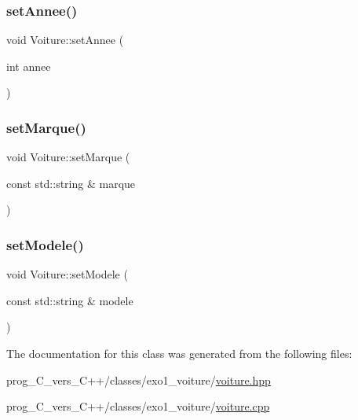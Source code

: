 \mbox{\label{classVoiture_aa8fcdac2ea378e472732cbea73f35952}} 
\subsubsection{\texorpdfstring{set\+Annee()}{setAnnee()}}
{\footnotesize\ttfamily void Voiture\+::set\+Annee (\begin{DoxyParamCaption}\item[{int}]{annee }\end{DoxyParamCaption})}

\mbox{\label{classVoiture_ae33ad51d151330c8f2aa5159711b2e45}} 
\subsubsection{\texorpdfstring{set\+Marque()}{setMarque()}}
{\footnotesize\ttfamily void Voiture\+::set\+Marque (\begin{DoxyParamCaption}\item[{const std\+::string \&}]{marque }\end{DoxyParamCaption})}

\mbox{\label{classVoiture_aab456718793ba70c0fe6bdfefd579a25}} 
\subsubsection{\texorpdfstring{set\+Modele()}{setModele()}}
{\footnotesize\ttfamily void Voiture\+::set\+Modele (\begin{DoxyParamCaption}\item[{const std\+::string \&}]{modele }\end{DoxyParamCaption})}



The documentation for this class was generated from the following files\+:\begin{DoxyCompactItemize}
\item 
prog\+\_\+\+C\+\_\+vers\+\_\+\+C++/classes/exo1\+\_\+voiture/\hyperlink{voiture_8hpp}{voiture.\+hpp}\item 
prog\+\_\+\+C\+\_\+vers\+\_\+\+C++/classes/exo1\+\_\+voiture/\hyperlink{voiture_8cpp}{voiture.\+cpp}\end{DoxyCompactItemize}
